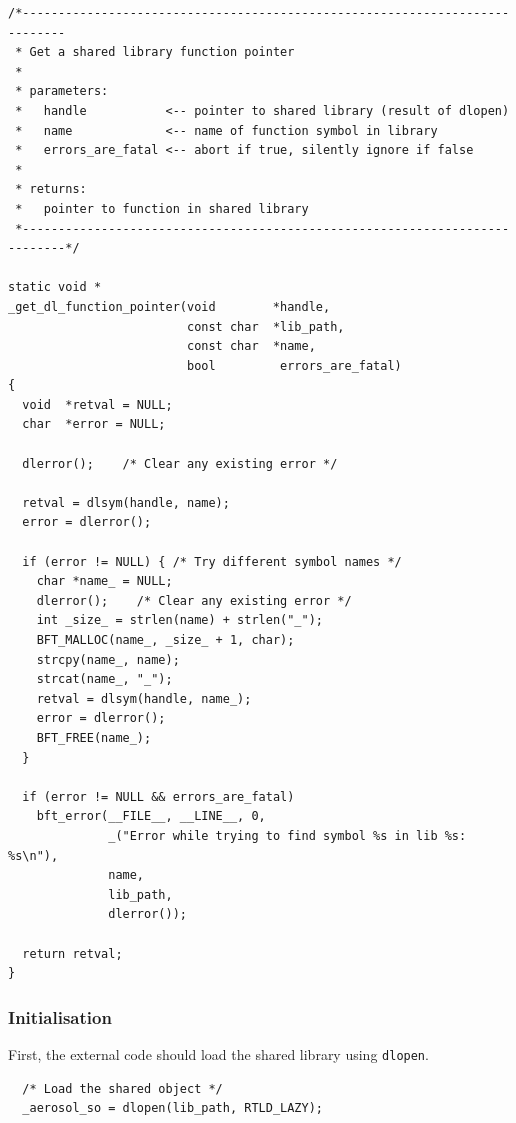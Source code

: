 \documentclass[a4paper,11pt]{article}
\begin{document}
\begin{verbatim}
/*----------------------------------------------------------------------------
 * Get a shared library function pointer
 *
 * parameters:
 *   handle           <-- pointer to shared library (result of dlopen)
 *   name             <-- name of function symbol in library
 *   errors_are_fatal <-- abort if true, silently ignore if false
 *
 * returns:
 *   pointer to function in shared library
 *----------------------------------------------------------------------------*/

static void *
_get_dl_function_pointer(void        *handle,
                         const char  *lib_path,
                         const char  *name,
                         bool         errors_are_fatal)
{
  void  *retval = NULL;
  char  *error = NULL;

  dlerror();    /* Clear any existing error */

  retval = dlsym(handle, name);
  error = dlerror();

  if (error != NULL) { /* Try different symbol names */
    char *name_ = NULL;
    dlerror();    /* Clear any existing error */
    int _size_ = strlen(name) + strlen("_");
    BFT_MALLOC(name_, _size_ + 1, char);
    strcpy(name_, name);
    strcat(name_, "_");
    retval = dlsym(handle, name_);
    error = dlerror();
    BFT_FREE(name_);
  }

  if (error != NULL && errors_are_fatal)
    bft_error(__FILE__, __LINE__, 0,
              _("Error while trying to find symbol %s in lib %s: %s\n"),
              name,
              lib_path,
              dlerror());

  return retval;
}
\end{verbatim}

\subsubsection*{Initialisation}

First, the external code should load the shared library using \texttt{dlopen}.
\begin{verbatim}
  /* Load the shared object */
  _aerosol_so = dlopen(lib_path, RTLD_LAZY);
\end{verbatim}
\end{document}
